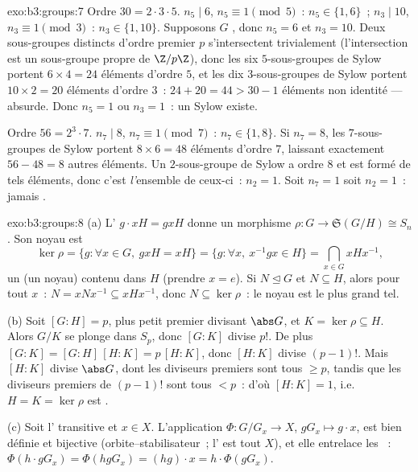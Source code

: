 \begin{solution}{exo:b3:groups:7}
Ordre $30 = 2 \cdot 3 \cdot 5$. $n_5 \mid 6$, $n_5 \equiv 1
\pmod 5$~: $n_5 \in \{1, 6\}$~; $n_3 \mid 10$, $n_3 \equiv 1
\pmod 3$~: $n_3 \in \{1, 10\}$. Supposons $G$ , donc $n_5 =
6$ et $n_3 = 10$. Deux sous-groupes distincts d'ordre premier $p$
s'intersectent trivialement (l'intersection est un sous-groupe
propre de $\Z/p\Z$), donc les six $5$-sous-groupes de Sylow
portent $6 \times 4 = 24$ éléments d'ordre $5$, et les dix
$3$-sous-groupes de Sylow portent $10 \times 2 = 20$ éléments
d'ordre $3$~: $24 + 20 = 44 > 30 - 1$ éléments non identité ---
absurde. Donc $n_5 = 1$ ou $n_3 = 1$~: un Sylow  existe.

Ordre $56 = 2^3 \cdot 7$. $n_7 \mid 8$, $n_7 \equiv 1 \pmod 7$~:
$n_7 \in \{1, 8\}$. Si $n_7 = 8$, les $7$-sous-groupes de Sylow
portent $8 \times 6 = 48$ éléments d'ordre $7$, laissant
exactement $56 - 48 = 8$ autres éléments. Un $2$-sous-groupe de
Sylow a ordre $8$ et est formé de tels éléments, donc c'est
\emph{l'}ensemble de ceux-ci~: $n_2 = 1$. Soit $n_7 = 1$ soit
$n_2 = 1$~: jamais .
\end{solution}

\begin{solution}{exo:b3:groups:8}
(a) L' $g \cdot xH = gxH$ donne un morphisme $\rho \colon G
\to \mathfrak S(G/H) \cong S_n$. Son noyau est
\[
\ker\rho = \{g : \forall x \in G,\ gxH = xH\}
= \{g : \forall x,\ x^{-1}gx \in H\}
= \bigcap_{x \in G} xHx^{-1},
\]
un  (un noyau) contenu dans $H$ (prendre $x =
e$). Si $N \trianglelefteq G$ et $N \subseteq H$, alors pour tout
$x$~: $N = xNx^{-1} \subseteq xHx^{-1}$, donc $N \subseteq
\ker\rho$~: le noyau est le plus grand tel.

(b) Soit $[G:H] = p$, plus petit premier divisant $\abs G$, et $K
= \ker\rho \subseteq H$. Alors $G/K$ se plonge dans $S_p$, donc
$[G:K]$ divise $p!$. De plus $[G:K] = [G:H]\,[H:K] = p\,[H:K]$,
donc $[H:K]$ divise $(p-1)!$. Mais $[H:K]$ divise $\abs G$, dont
les diviseurs premiers sont tous $\geq p$, tandis que les
diviseurs premiers de $(p-1)!$ sont tous $< p$~: d'où $[H:K] =
1$, i.e.\ $H = K = \ker \rho$ est .

(c) Soit l' transitive et $x \in X$. L'application $\Phi
\colon G/G_x \to X$, $gG_x \mapsto g \cdot x$, est bien définie
et bijective (orbite--stabilisateur~; l' est tout $X$), et
elle entrelace les ~: $\Phi(h \cdot gG_x) = \Phi(hgG_x) =
(hg) \cdot x = h \cdot \Phi(gG_x)$.
\end{solution}

